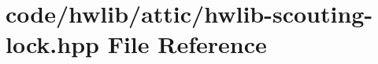 \hypertarget{hwlib-scouting-_01lock_8hpp}{}\section{code/hwlib/attic/hwlib-\/scouting-\/ lock.\+hpp File Reference}
\label{hwlib-scouting-_01lock_8hpp}
